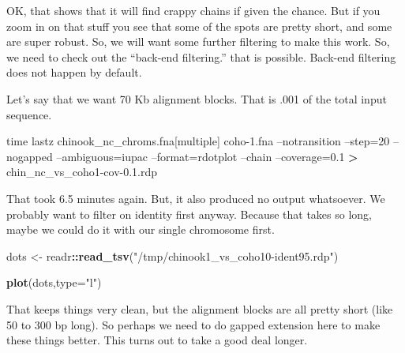 \documentclass[]{krantz}
\makeatletter
\newenvironment{Shaded}{\begin{snugshade}}{\end{snugshade}}
\newcommand{\BuiltInTok}[1]{#1}
\newcommand{\DataTypeTok}[1]{\textcolor[rgb]{0.27,0.27,0.27}{#1}}
\newcommand{\KeywordTok}[1]{\textcolor[rgb]{0.27,0.27,0.27}{\textbf{#1}}}
\newcommand{\NormalTok}[1]{#1}
\newcommand{\OperatorTok}[1]{\textcolor[rgb]{0.43,0.43,0.43}{\textbf{#1}}}
\newcommand{\StringTok}[1]{\textcolor[rgb]{0.5,0.5,0.5}{#1}}
\newcommand{\VariableTok}[1]{\textcolor[rgb]{0,0,0}{#1}}
\newenvironment{kframe}{%
\medskip{}
\setlength{\fboxsep}{.8em}
 \def\at@end@of@kframe{}%
 \ifinner\ifhmode%
  \def\at@end@of@kframe{\end{minipage}}%
  \begin{minipage}{\columnwidth}%
 \fi\fi%
 \def\FrameCommand##1{\hskip\@totalleftmargin \hskip-\fboxsep
 \colorbox{shadecolor}{##1}\hskip-\fboxsep
     \hskip-\linewidth \hskip-\@totalleftmargin \hskip\columnwidth}%
 \MakeFramed {\advance\hsize-\width
   \@totalleftmargin\z@ \linewidth\hsize
   \@setminipage}}%
 {\par\unskip\endMakeFramed%
 \at@end@of@kframe}
\renewenvironment{Shaded}{\begin{kframe}}{\end{kframe}}
\makeatother
\begin{document}
OK, that shows that it will find crappy chains if given the chance. But if you
zoom in on that stuff you see that some of the spots are pretty short, and some are super
robust. So, we will want some further filtering
to make this work. So, we need to check out the ``back-end filtering.'' that is possible.
Back-end filtering does not happen by default.

Let's say that we want 70 Kb alignment blocks. That is .001 of the total input sequence.

\begin{Shaded}
\begin{Highlighting}[]
\BuiltInTok{time}\NormalTok{ lastz chinook_nc_chroms.fna[multiple]  coho-1.fna --notransition --step=20 --nogapped --ambiguous=iupac --format=rdotplot --chain --coverage=0.1 }\OperatorTok{>}\NormalTok{ chin_nc_vs_coho1-cov-0.1.rdp}
\end{Highlighting}
\end{Shaded}

That took 6.5 minutes again. But, it also produced no output whatsoever. We probably
want to filter on identity first anyway. Because that takes so long, maybe we could
do it with our single chromosome first.

\begin{Shaded}
\end{Shaded}

\begin{Shaded}
\begin{Highlighting}[]
\NormalTok{dots <-}\StringTok{ }\NormalTok{readr}\OperatorTok{::}\KeywordTok{read_tsv}\NormalTok{(}\StringTok{"/tmp/chinook1_vs_coho10-ident95.rdp"}\NormalTok{)}

\KeywordTok{plot}\NormalTok{(dots,}\DataTypeTok{type=}\StringTok{"l"}\NormalTok{)}
\end{Highlighting}
\end{Shaded}

That keeps things very clean, but the alignment blocks are all pretty short (like 50 to 300
bp long). So perhaps we need to do gapped extension here to make these things better. This
turns out to take a good deal longer.
\end{document}
